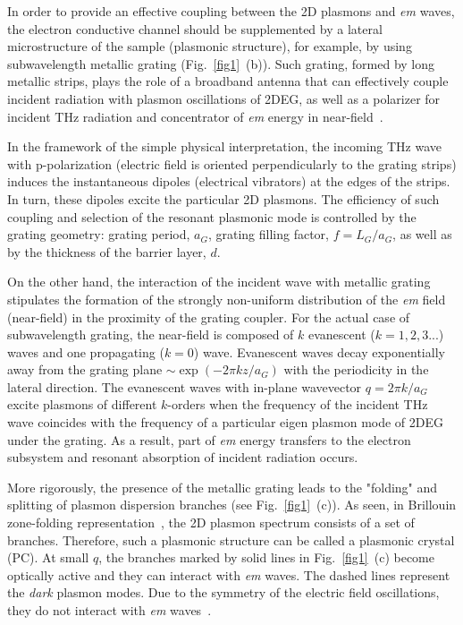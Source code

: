 \documentclass[%
 reprint,
 amsmath,amssymb,
 aps,
]{revtex4-2}
\begin{document}
 In order to provide an effective coupling between the 2D plasmons and \textit{em} waves, the electron conductive channel should be supplemented by a lateral microstructure of the sample (plasmonic structure), for example, by using subwavelength metallic grating (Fig.~\ref{fig1}~(b)).
 Such grating, formed by long metallic strips, plays the role of a broadband antenna that can effectively couple incident radiation with plasmon oscillations of 2DEG, as well as a polarizer for incident THz radiation and concentrator of \textit{em} energy in near-field~\cite{Kor2012, Kor2014}.

In the framework of the simple physical interpretation, the incoming THz wave with p-polarization (electric field is oriented perpendicularly to the grating strips) induces the instantaneous dipoles (electrical vibrators) at the edges of the strips. In turn, these dipoles excite the particular 2D plasmons. The efficiency of such coupling and selection of the resonant plasmonic mode is controlled by the grating geometry: grating period, $a_{G}$, grating filling factor, $f=L_{G}/a_{G}$, as well as by the thickness of the barrier layer, $d$.

On the other hand, the interaction of the incident wave with metallic grating stipulates the formation of the strongly non-uniform distribution of the \textit{em} field (near-field) in the proximity of the grating coupler. For the actual case of subwavelength grating, the near-field is composed of $k$ evanescent ($k = 1,2, 3...$) waves and one propagating ($k=0$) wave. 
Evanescent waves decay exponentially away from the grating plane $\sim \exp(-2 \pi k z /a_G)$ with the periodicity in the lateral direction. 
The evanescent waves with in-plane wavevector $q = 2 \pi k / a_G$  excite plasmons of different $k$-orders when the frequency of the incident THz wave coincides with the frequency of a particular eigen plasmon mode of 2DEG under the grating. 
As a result, part of \textit{em} energy transfers to the electron subsystem and resonant absorption of incident radiation occurs.

More rigorously, the presence of the metallic grating leads to the "folding" and splitting of plasmon dispersion branches (see Fig.~\ref{fig1}~(c)). As seen, in Brillouin zone-folding representation~\cite{Ager1991, Petrov2017}, the 2D plasmon spectrum consists of a set of branches. Therefore, such a plasmonic structure can be called a plasmonic crystal (PC). At small $q$, the branches marked by solid lines in Fig.~\ref{fig1}~(c) become optically active and they can interact with \textit{em} waves. The dashed lines represent the \textit{ dark} plasmon modes. Due to the symmetry of the electric field oscillations, they do not interact with \textit{em} waves~\cite{Popov1993}.
\end{document}
